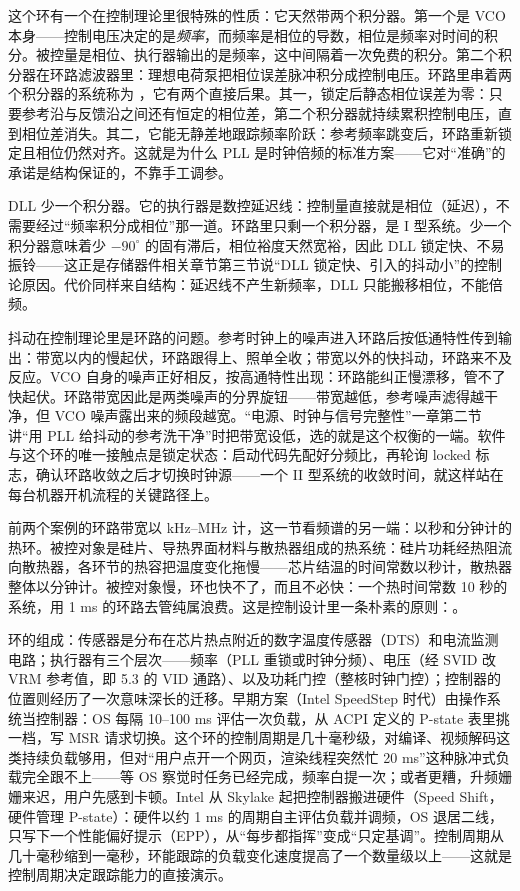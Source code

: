 这个环有一个在控制理论里很特殊的性质：它天然带两个积分器。第一个是 VCO 本身——控制电压决定的是\emph{频率}，而频率是相位的导数，相位是频率对时间的积分。被控量是相位、执行器输出的是频率，这中间隔着一次免费的积分。第二个积分器在环路滤波器里：理想电荷泵把相位误差脉冲积分成控制电压。环路里串着两个积分器的系统称为 ，它有两个直接后果。其一，锁定后静态相位误差为零：只要参考沿与反馈沿之间还有恒定的相位差，第二个积分器就持续累积控制电压，直到相位差消失。其二，它能无静差地跟踪频率阶跃：参考频率跳变后，环路重新锁定且相位仍然对齐。这就是为什么 PLL 是时钟倍频的标准方案——它对“准确”的承诺是结构保证的，不靠手工调参。

DLL 少一个积分器。它的执行器是数控延迟线：控制量直接就是相位（延迟），不需要经过“频率积分成相位”那一道。环路里只剩一个积分器，是 I 型系统。少一个积分器意味着少 $-90^{\circ}$ 的固有滞后，相位裕度天然宽裕，因此 DLL 锁定快、不易振铃——这正是存储器件相关章节第三节说“DLL 锁定快、引入的抖动小”的控制论原因。代价同样来自结构：延迟线不产生新频率，DLL 只能搬移相位，不能倍频。

抖动在控制理论里是环路的问题。参考时钟上的噪声进入环路后按低通特性传到输出：带宽以内的慢起伏，环路跟得上、照单全收；带宽以外的快抖动，环路来不及反应。VCO 自身的噪声正好相反，按高通特性出现：环路能纠正慢漂移，管不了快起伏。环路带宽因此是两类噪声的分界旋钮——带宽越低，参考噪声滤得越干净，但 VCO 噪声露出来的频段越宽。“电源、时钟与信号完整性”一章第二节讲“用 PLL 给抖动的参考洗干净”时把带宽设低，选的就是这个权衡的一端。软件与这个环的唯一接触点是锁定状态：启动代码先配好分频比，再轮询 locked 标志，确认环路收敛之后才切换时钟源——一个 II 型系统的收敛时间，就这样站在每台机器开机流程的关键路径上。


前两个案例的环路带宽以 kHz--MHz 计，这一节看频谱的另一端：以秒和分钟计的热环。被控对象是硅片、导热界面材料与散热器组成的热系统：硅片功耗经热阻流向散热器，各环节的热容把温度变化拖慢——芯片结温的时间常数以秒计，散热器整体以分钟计。被控对象慢，环也快不了，而且不必快：一个热时间常数 10 秒的系统，用 1 ms 的环路去管纯属浪费。这是控制设计里一条朴素的原则：。

环的组成：传感器是分布在芯片热点附近的数字温度传感器（DTS）和电流监测电路；执行器有三个层次——频率（PLL 重锁或时钟分频）、电压（经 SVID 改 VRM 参考值，即 5.3 的 VID 通路）、以及功耗门控（整核时钟门控）；控制器的位置则经历了一次意味深长的迁移。早期方案（Intel SpeedStep 时代）由操作系统当控制器：OS 每隔 10--100 ms 评估一次负载，从 ACPI 定义的 P-state 表里挑一档，写 MSR 请求切换。这个环的控制周期是几十毫秒级，对编译、视频解码这类持续负载够用，但对“用户点开一个网页，渲染线程突然忙 20 ms”这种脉冲式负载完全跟不上——等 OS 察觉时任务已经完成，频率白提一次；或者更糟，升频姗姗来迟，用户先感到卡顿。Intel 从 Skylake 起把控制器搬进硬件（Speed Shift，硬件管理 P-state）：硬件以约 1 ms 的周期自主评估负载并调频，OS 退居二线，只写下一个性能偏好提示（EPP），从“每步都指挥”变成“只定基调”。控制周期从几十毫秒缩到一毫秒，环能跟踪的负载变化速度提高了一个数量级以上——这就是控制周期决定跟踪能力的直接演示。

